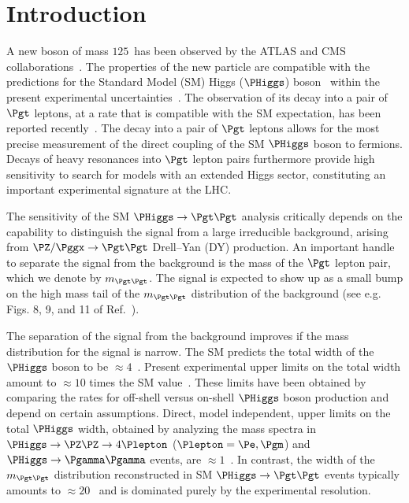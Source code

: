 \section{Introduction}
\label{sec:introduction}

A new boson of mass $125$~\GeV has been observed by the ATLAS and CMS collaborations~\cite{Higgs-Discovery_CMS,Higgs-Discovery_ATLAS}.
The properties of the new particle are compatible with the predictions for the Standard Model (SM) 
Higgs ($\PHiggs$) boson~\cite{Englert:1964et,Higgs:1964ia,Higgs:1964pj,Guralnik:1964eu,Higgs:1966ev,Kibble:1967sv}
within the present experimental uncertainties~\cite{HIG-14-014,Chatrchyan:2014tja,Khachatryan:2014iha,HIG-14-009}.
The observation of its decay into a pair of $\Pgt$ leptons, at a rate that is compatible with the SM expectation, has been reported recently~\cite{HIG-13-004,Aad:2015vsa,HIG-15-002}.
The decay into a pair of $\Pgt$ leptons allows for the most precise measurement of the direct coupling of the SM $\PHiggs$ boson to fermions.
Decays of heavy resonances into $\Pgt$ lepton pairs furthermore provide high sensitivity to search for models with an extended Higgs sector,
constituting an important experimental signature at the LHC.

The sensitivity of the SM $\PHiggs \to \Pgt\Pgt$ analysis critically depends on
the capability to distinguish the signal from a large irreducible background, arising from $\PZ/\Pggx \to \Pgt\Pgt$ Drell--Yan (DY) production.
An important handle to separate the signal from the background is the mass of the $\Pgt$ lepton pair, which we denote by $m_{\Pgt\Pgt}$.
The signal is expected to show up as a small bump on the high mass tail of the $m_{\Pgt\Pgt}$ distribution of the background
(see e.g. Figs. 8, 9, and 11 of Ref.~\cite{HIG-13-004}).

The separation of the signal from the background improves if the mass distribution for the signal is narrow.
The SM predicts the total width of the $\PHiggs$ boson to be $\approx 4$~\MeV.
Present experimental upper limits on the total width amount to $\approx 10$ times the SM value~\cite{HIG-14-002,Aad:2015xua}.
These limits have been obtained by comparing the rates for off-shell versus on-shell $\PHiggs$ boson production and depend on certain assumptions.
Direct, model independent, upper limits on the total $\PHiggs$ width, 
obtained by analyzing the mass spectra in $\PHiggs \to \PZ\PZ \to 4 \Plepton$ ($\Plepton = \Pe, \Pgm$) and $\PHiggs \to \Pgamma\Pgamma$ events, are $\approx 1$~\GeV.
In contrast, the width of the $m_{\Pgt\Pgt}$ distribution reconstructed in SM $\PHiggs \to \Pgt\Pgt$ events typically amounts to $\approx 20$~\GeV 
and is dominated purely by the experimental resolution.

